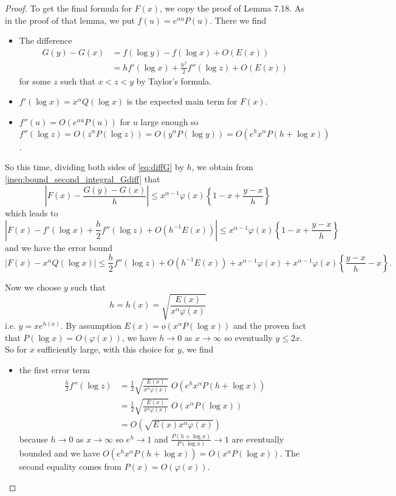 \documentclass[12pt]{article}
\newcommand{\Abs}[1]{\left| #1 \right|}
\begin{document}
\begin{proof}
To get the final formula for $F(x)$, we copy the proof of Lemma 7.18. As in the proof of that lemma, we put $f(u) = e^{\alpha u} P(u)$. There we find
\begin{itemize}
\item The difference
\begin{align*}
G(y) - G(x) &= f(\log y) - f(\log x) + O(E(x))\\
&= h f'(\log x) + \frac{h^2}{2} f''(\log z) + O(E(x))
\end{align*}
for some $z$ such that $x < z < y$ by Taylor's formula.

\item $f'(\log x) = x^\alpha Q(\log x)$ is the expected main term for $F(x)$.

\item $f''(u) = O(e^{\alpha u} P(u))$ for $u$ large enough so $f''(\log z) = O(z^\alpha P(\log z)) = O(y^\alpha P(\log y)) = O(e^h x^\alpha P(h + \log x))$.
\end{itemize}
So this time, dividing both sides of \eqref{eq:diffG} by $h$, we obtain from \eqref{ineq:bound_second_integral_Gdiff} that
$$\Abs{F(x) - \frac{G(y) - G(x)}{h}} \leq x^{\alpha - 1} \varphi(x) \left\{ 1 - x + \frac{y - x}{h} \right\}$$
which leads to
$$\Abs{F(x) - f'(\log x) + \frac{h}{2} f''(\log z) + O(h^{-1} E(x))} \leq x^{\alpha - 1} \varphi(x) \left\{ 1 - x + \frac{y - x}{h} \right\}$$
and we have the error bound
$$\Abs{F(x) - x^\alpha Q(\log x)} \leq \frac{h}{2} f''(\log z) + O(h^{-1} E(x)) + x^{\alpha - 1} \varphi(x) + x^{\alpha - 1} \varphi(x) \left\{\frac{y - x}{h} - x \right\}.$$

Now we choose $y$ such that
$$h = h(x) = \sqrt{\frac{E(x)}{x^\alpha \varphi(x)}}$$
i.e. $y = x e^{h(x)}$. By assumption $E(x) = o(x^\alpha P(\log x))$ and the proven fact that $P(\log x) = O(\varphi(x))$, we have $h \rightarrow 0$ as $x \rightarrow \infty$ so eventually $y \leq 2x$. So for $x$ sufficiently large, with this choice for $y$, we find
\begin{itemize}
\item the first error term
\begin{align*}
\frac{h}{2} f''(\log z) &= \frac{1}{2} \sqrt{\frac{E(x)}{x^\alpha \varphi(x)}} \; O(e^h x^\alpha P(h + \log x)) \\
&= \frac{1}{2} \sqrt{\frac{E(x)}{x^\alpha \varphi(x)}} \; O(x^\alpha P(\log x)) \\
&= O(\sqrt{E(x) x^\alpha \varphi(x)})
\end{align*}
because $h \rightarrow 0$ as $x \rightarrow \infty$ so $e^h \rightarrow 1$ and $\frac{P(h + \log x)}{P(\log x)} \rightarrow 1$ are eventually bounded and we have $O(e^h x^\alpha P(h + \log x)) = O(x^\alpha P(\log x))$. The second equality comes from $P(x) = O(\varphi(x))$.


\end{itemize}
\end{proof}
\end{document}
